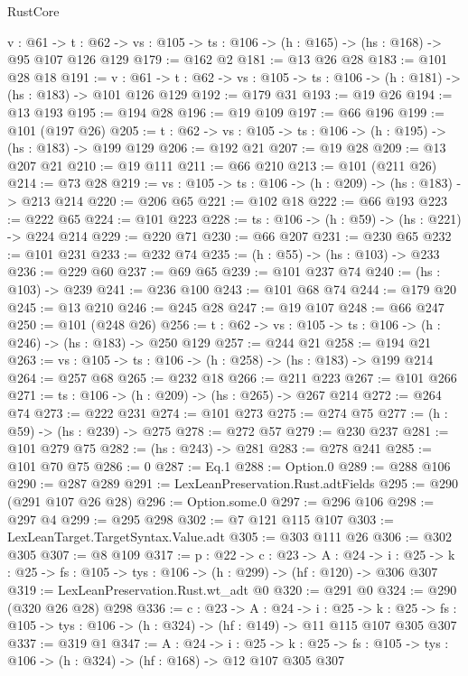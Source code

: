 \begin{lexlean}{RustCore}
\begin{coremodule}
  {v : @61} ->
  {t : @62} -> {vs : @105} -> {ts : @106} -> (h : @165) -> (hs : @168) -> @95 @107 @126 @129
@179 := @162 @2
@181 := @13 @26 @28
@183 := @101 @28 @18
@191 := {v : @61} ->
  {t : @62} -> {vs : @105} -> {ts : @106} -> (h : @181) -> (hs : @183) -> @101 @126 @129
@192 := @179 @31
@193 := @19 @26
@194 := @13 @193
@195 := @194 @28
@196 := @19 @109
@197 := @66 @196
@199 := @101 (@197 @26)
@205 := {t : @62} -> {vs : @105} -> {ts : @106} -> (h : @195) -> (hs : @183) -> @199 @129
@206 := @192 @21
@207 := @19 @28
@209 := @13 @207 @21
@210 := @19 @111
@211 := @66 @210
@213 := @101 (@211 @26)
@214 := @73 @28
@219 := {vs : @105} -> {ts : @106} -> (h : @209) -> (hs : @183) -> @213 @214
@220 := @206 @65
@221 := @102 @18
@222 := @66 @193
@223 := @222 @65
@224 := @101 @223
@228 := {ts : @106} -> (h : @59) -> (hs : @221) -> @224 @214
@229 := @220 @71
@230 := @66 @207
@231 := @230 @65
@232 := @101 @231
@233 := @232 @74
@235 := (h : @55) -> (hs : @103) -> @233
@236 := @229 @60
@237 := @69 @65
@239 := @101 @237 @74
@240 := (hs : @103) -> @239
@241 := @236 @100
@243 := @101 @68 @74
@244 := @179 @20
@245 := @13 @210
@246 := @245 @28
@247 := @19 @107
@248 := @66 @247
@250 := @101 (@248 @26)
@256 := {t : @62} -> {vs : @105} -> {ts : @106} -> (h : @246) -> (hs : @183) -> @250 @129
@257 := @244 @21
@258 := @194 @21
@263 := {vs : @105} -> {ts : @106} -> (h : @258) -> (hs : @183) -> @199 @214
@264 := @257 @68
@265 := @232 @18
@266 := @211 @223
@267 := @101 @266
@271 := {ts : @106} -> (h : @209) -> (hs : @265) -> @267 @214
@272 := @264 @74
@273 := @222 @231
@274 := @101 @273
@275 := @274 @75
@277 := (h : @59) -> (hs : @239) -> @275
@278 := @272 @57
@279 := @230 @237
@281 := @101 @279 @75
@282 := (hs : @243) -> @281
@283 := @278 @241
@285 := @101 @70 @75
@286 := 0
@287 := Eq.{1}
@288 := Option.{0}
@289 := @288 @106
@290 := @287 @289
@291 := LexLeanPreservation.Rust.adtFields
@295 := @290 (@291 @107 @26 @28)
@296 := Option.some.{0}
@297 := @296 @106
@298 := @297 @4
@299 := @295 @298
@302 := @7 @121 @115 @107
@303 := LexLeanTarget.TargetSyntax.Value.adt
@305 := @303 @111 @26
@306 := @302 @305
@307 := @8 @109
@317 := {p : @22} ->
  {c : @23} ->
  {A : @24} ->
  {i : @25} -> {k : @25} -> {fs : @105} -> {tys : @106} -> (h : @299) -> (hf : @120) -> @306 @307
@319 := LexLeanPreservation.Rust.wt_adt @0
@320 := @291 @0
@324 := @290 (@320 @26 @28) @298
@336 := {c : @23} ->
  {A : @24} ->
  {i : @25} ->
  {k : @25} -> {fs : @105} -> {tys : @106} -> (h : @324) -> (hf : @149) -> @11 @115 @107 @305 @307
@337 := @319 @1
@347 := {A : @24} ->
  {i : @25} ->
  {k : @25} -> {fs : @105} -> {tys : @106} -> (h : @324) -> (hf : @168) -> @12 @107 @305 @307

\end{coremodule}
\end{lexlean}
